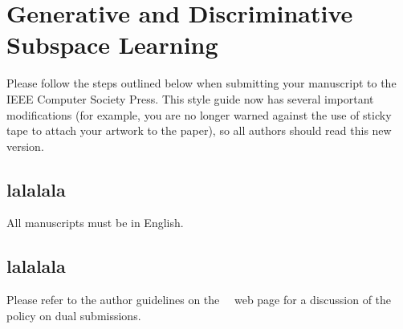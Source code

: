 \section{Generative and Discriminative Subspace Learning}
\label{sec:intro}

Please follow the steps outlined below when submitting your manuscript to the IEEE Computer Society Press.
This style guide now has several important modifications (for example, you are no longer warned against the use of sticky tape to attach your artwork to the paper), so all authors should read this new version.

\subsection{lalalala}

All manuscripts must be in English.

\subsection{lalalala}

Please refer to the author guidelines on the \confName\ \confYear\ web page for a
discussion of the policy on dual submissions.